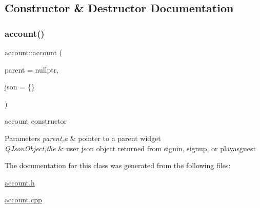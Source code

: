 \subsection{Constructor \& Destructor Documentation}
\mbox{\label{classaccount_a366fd4d75f8c386ea788b0497e8a7cac}} 
\subsubsection{\texorpdfstring{account()}{account()}}
{\footnotesize\ttfamily account\+::account (\begin{DoxyParamCaption}\item[{Q\+Widget $\ast$}]{parent = {\ttfamily nullptr},  }\item[{Q\+Json\+Object}]{json = {\ttfamily \{\}} }\end{DoxyParamCaption})\hspace{0.3cm}{\ttfamily [explicit]}}



account constructor 


\begin{DoxyParams}{Parameters}
{\em parent,a} & pointer to a parent widget \\
\hline
{\em Q\+Json\+Object,the} & user json object returned from signin, signup, or playasguest \\
\hline
\end{DoxyParams}


The documentation for this class was generated from the following files\+:\begin{DoxyCompactItemize}
\item 
\hyperlink{account_8h}{account.\+h}\item 
\hyperlink{account_8cpp}{account.\+cpp}\end{DoxyCompactItemize}
